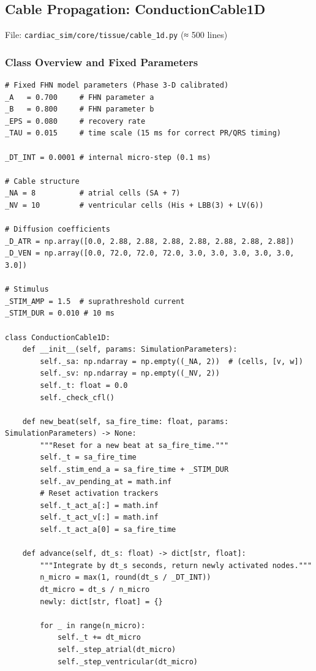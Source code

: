 \documentclass[12pt,a4paper,oneside]{book}
\begin{document}
\subsection{Cable Propagation: ConductionCable1D}

File: \texttt{cardiac\_sim/core/tissue/cable\_1d.py} (≈ 500 lines)

\subsubsection{Class Overview and Fixed Parameters}

\begin{lstlisting}
# Fixed FHN model parameters (Phase 3-D calibrated)
_A   = 0.700     # FHN parameter a
_B   = 0.800     # FHN parameter b
_EPS = 0.080     # recovery rate
_TAU = 0.015     # time scale (15 ms for correct PR/QRS timing)

_DT_INT = 0.0001 # internal micro-step (0.1 ms)

# Cable structure
_NA = 8          # atrial cells (SA + 7)
_NV = 10         # ventricular cells (His + LBB(3) + LV(6))

# Diffusion coefficients
_D_ATR = np.array([0.0, 2.88, 2.88, 2.88, 2.88, 2.88, 2.88, 2.88])
_D_VEN = np.array([0.0, 72.0, 72.0, 72.0, 3.0, 3.0, 3.0, 3.0, 3.0, 3.0])

# Stimulus
_STIM_AMP = 1.5  # suprathreshold current
_STIM_DUR = 0.010 # 10 ms

class ConductionCable1D:
    def __init__(self, params: SimulationParameters):
        self._sa: np.ndarray = np.empty((_NA, 2))  # (cells, [v, w])
        self._sv: np.ndarray = np.empty((_NV, 2))
        self._t: float = 0.0
        self._check_cfl()
    
    def new_beat(self, sa_fire_time: float, params: SimulationParameters) -> None:
        """Reset for a new beat at sa_fire_time."""
        self._t = sa_fire_time
        self._stim_end_a = sa_fire_time + _STIM_DUR
        self._av_pending_at = math.inf
        # Reset activation trackers
        self._t_act_a[:] = math.inf
        self._t_act_v[:] = math.inf
        self._t_act_a[0] = sa_fire_time
    
    def advance(self, dt_s: float) -> dict[str, float]:
        """Integrate by dt_s seconds, return newly activated nodes."""
        n_micro = max(1, round(dt_s / _DT_INT))
        dt_micro = dt_s / n_micro
        newly: dict[str, float] = {}
        
        for _ in range(n_micro):
            self._t += dt_micro
            self._step_atrial(dt_micro)
            self._step_ventricular(dt_micro)
            

\end{lstlisting}
\end{document}
